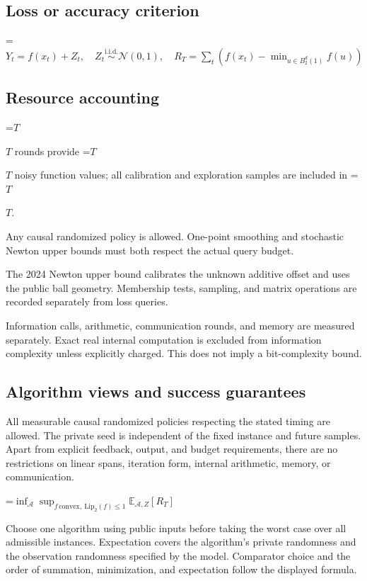 \documentclass[10pt,a4paper]{article}
\newcommand{\AtlasMath}[1]{\par\begingroup\centering\setbox0=\hbox{$\displaystyle #1$}\ifdim\wd0>1.4\linewidth\typeout{ATLAS WIDE FORMULA: \the\wd0}\fi\ifdim\wd0>\linewidth\resizebox{\linewidth}{!}{\box0}\else\box0\fi\par\endgroup}
\newcommand{\AtlasInlineMath}[1]{\begingroup\setbox0=\hbox{$#1$}\ifdim\wd0>.4\linewidth\endgroup\AtlasMath{#1}\else\endgroup$#1$\fi}
\begin{document}
\subsection{Loss or accuracy criterion}

\AtlasMath{Y_t=f(x_t)+Z_t,\quad Z_t\overset{\mathrm{i.i.d.}}\sim\mathcal{N}(0,1),\quad R_T=\sum_t\left(f(x_t)-\min_{u\in B_2^d(1)}f(u)\right)}


\subsection{Resource accounting}
\AtlasInlineMath{T} rounds provide \AtlasInlineMath{T} noisy function values; all calibration and exploration samples are included in \AtlasInlineMath{T}.

Any causal randomized policy is allowed. One-point smoothing and stochastic Newton upper bounds must both respect the actual query budget.

The 2024 Newton upper bound calibrates the unknown additive offset and uses the public ball geometry. Membership tests, sampling, and matrix operations are recorded separately from loss queries.

Information calls, arithmetic, communication rounds, and memory are measured separately. Exact real internal computation is excluded from information complexity unless explicitly charged. This does not imply a bit-complexity bound.

\subsection{Algorithm views and success guarantees}
All measurable causal randomized policies respecting the stated timing are allowed. The private seed is independent of the fixed instance and future samples. Apart from explicit feedback, output, and budget requirements, there are no restrictions on linear spans, iteration form, internal arithmetic, memory, or communication.


\AtlasMath{\inf_{\mathcal{A}}\sup_{f\,\mathrm{convex},\ \mathrm{Lip}_2(f)\le1}\mathbb{E}_{\mathcal{A},Z}[R_T]}


Choose one algorithm using public inputs before taking the worst case over all admissible instances. Expectation covers the algorithm's private randomness and the observation randomness specified by the model. Comparator choice and the order of summation, minimization, and expectation follow the displayed formula.
\end{document}
